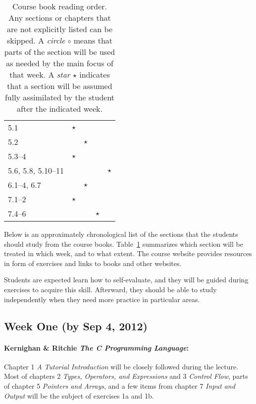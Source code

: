 \documentclass[a4paper]{article}
\begin{document}
\begin{table}
\begin{tabular}{|l|c|c|c|c|}
    5.1                & $\star$ &         &         & \\
    5.2                &         & $\star$ &         & \\
    5.3--4             & $\star$ &         &         & \\
    5.6, 5.8, 5.10--11 &         &         &         & $\star$ \\
    \hline
    6.1--4, 6.7        &         & $\star$ &         & \\
    \hline
    7.1--2             & $\star$ &         &         & \\
    7.4--6             &         &         & $\star$ & \\
    \hline
  \end{tabular}
  \caption{
    Course book reading order.
    Any sections or chapters that are not explicitly listed can be skipped.
    A \emph{circle} $\circ$ means that parts of the section will be used as needed by the main focus of that week.
    A \emph{star} $\star$ indicates that a section will be assumed fully assimilated by the student after the indicated week.
  }\label{tab:reading-guide}
\end{table}

Below is an approximately chronological list of the sections that the students should study from the course books.
Table~\ref{tab:reading-guide} summarizes which section will be treated in which week, and to what extent.
The course website provides resources in form of exercises and links to books and other websites.

Students are expected learn how to self-evaluate, and they will be guided during exercises to acquire this skill.
Afterward, they should be able to study independently when they need more practice in particular areas.


\subsection*{Week One (by Sep 4, 2012)}

\paragraph{Kernighan \& Ritchie \emph{The C Programming Language}:}
Chapter 1 \emph{A Tutorial Introduction} will be closely followed during the lecture.
Most of chapters 2 \emph{Types, Operators, and Expressions} and 3 \emph{Control Flow}, parts of chapter 5 \emph{Pointers and Arrays}, and a few items from chapter 7 \emph{Input and Output} will be the subject of exercises 1a and 1b.
\end{document}
